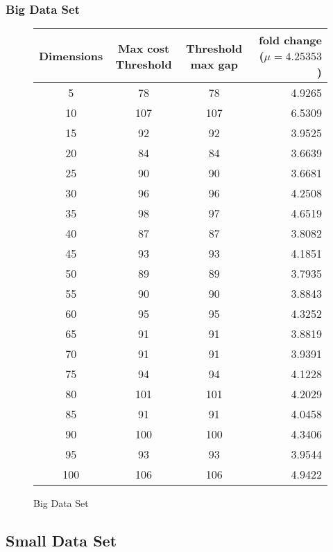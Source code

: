 \documentclass[a4paper,10pt]{article}
\begin{document}
\subsubsection{Big Data Set}
\begin{figure}[h]
	\centering
	\begin{tabular}{|c|c|c|r|}
		\hline
		Dimensions & Max cost Threshold & Threshold max gap & fold change ($\mu = 4.25353$) \\\hline
		5 & 78 & 78 & 4.9265 \\\hline
		10 & 107 & 107 & 6.5309 \\\hline
		15 & 92 & 92 & 3.9525 \\\hline
		20 & 84 & 84 & 3.6639 \\\hline
		25 & 90 & 90 & 3.6681 \\\hline
		30 & 96 & 96 & 4.2508 \\\hline
		35 & 98 & 97 & 4.6519 \\\hline
		40 & 87 & 87 & 3.8082 \\\hline
		45 & 93 & 93 & 4.1851 \\\hline
		50 & 89 & 89 & 3.7935 \\\hline
		55 & 90 & 90 & 3.8843 \\\hline
		60 & 95 & 95 & 4.3252 \\\hline
		65 & 91 & 91 & 3.8819 \\\hline
		70 & 91 & 91 & 3.9391 \\\hline
		75 & 94 & 94 & 4.1228 \\\hline
		80 & 101 & 101 & 4.2029 \\\hline
		85 & 91 & 91 & 4.0458 \\\hline
		90 & 100 & 100 & 4.3406 \\\hline
		95 & 93 & 93 & 3.9544 \\\hline
		100 & 106 & 106 & 4.9422 \\\hline
	\end{tabular}
	\caption{Big Data Set}
\end{figure}


\subsection{Small Data Set}
\end{document}
